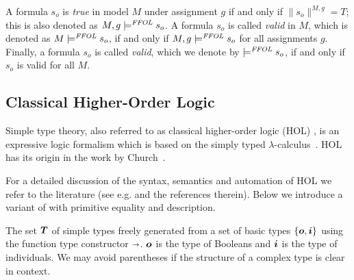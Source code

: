 \begin{definition}[Validity]\label{ffollvalid}
  A formula $s_o$ is \emph{true} in model $M$ under assignment $g$ if and only if
  $\|s_o\|^{M,g} = T$; this is also denoted as $M,g \models^{\mathit{FFOL}} s_o$.  A
  formula $s_o$ is called \emph{valid} in $M$, which is denoted as
  $M \models^{\mathit{FFOL}} s_o$, if and only if $M,g \models^{\mathit{FFOL}} s_o$ for all assignments
  $g$. Finally, a formula $s_o$ is called \emph{valid}, which we
  denote by $\models^{\mathit{FFOL}} s_o$, if and only if $s_o$ is valid for all
  $M$. 
\end{definition}


\subsection{Classical Higher-Order Logic}
Simple type theory, also referred to as classical higher-order logic
(HOL) \cite{AndrewsSEP}, is an expressive logic formalism which is based on the simply typed
$\lambda$-calculus~\cite{barendregt13book}. 
  HOL has its origin in the work by
  Church~\cite{Church40}.

For a detailed discussion of the syntax, semantics and automation
of  HOL we refer to the literature (see e.g.
\cite{AndrewsSEP,B5,J6} and the
references therein). Below we introduce a variant of \HOL with primitive equality
and description. 



\begin{definition}[Types]\label{holtypes}
  The set $\boldsymbol{T}$ of simple types freely generated from a set of
  basic types $\{\boldsymbol{o}, \boldsymbol{i}\}$ using the function type
  constructor $\boldsymbol{\shortrightarrow}$. $\boldsymbol{o}$ is the type of Booleans and 
  $\boldsymbol{i}$ is the type of individuals. We
  may avoid parentheses if the structure of a complex type is clear in context.
\end{definition}

